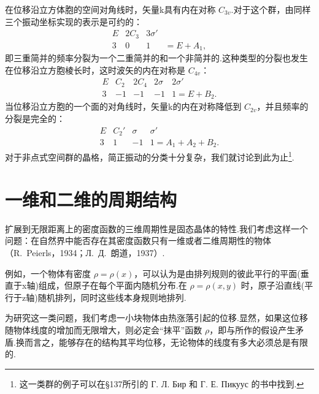 在位移沿立方体胞的空间对角线时，矢量k具有内在对称 $C_{3v}$.对于这个群，由同样三个振动坐标实现的表示是可约的：
\begin{equation*}
\begin{array}{cccc}
  E & 2C_3 & 3\sigma' & \\
  3 & 0 & 1 & =E+A_1,
\end{array}
\end{equation*}
即三重简并的频率分裂为一个二重简并的和一个非简并的.这种类型的分裂也发生在位移沿立方胞棱长时，这时波矢的内在对称是 $C_{4v}$：
\begin{equation*}
\begin{array}{ccccc}
  E & C_2 & 2C_4 & 2\sigma & 2\sigma' \\
  3 & -1 & -1 & -1 & 1=E+B_2.
\end{array}
\end{equation*}
当位移沿立方胞的一个面的对角线时，矢量k的内在对称降低到 $C_{2v}$，并且频率的分裂是完全的：
\begin{equation*}
\begin{array}{cccc}
  E & C_2' & \sigma & \sigma' \\
  3 & 1 & -1 & 1=A_1+A_2+B_2.
\end{array}
\end{equation*}
对于非点式空间群的晶格，简正振动的分类十分复杂，我们就讨论到此为止\footnote{这一类群的例子可以在§137所引的 Г. Л. Бир 和 Г. Е. Пикуус 的书中找到.}.

\section{一维和二维的周期结构}

扩展到无限距离上的密度函数的三维周期性是固态晶体的特性.我们考虑这样一个问题：在自然界中能否存在其密度函数只有一维或者二维周期性的物体（R.~Peierls，1934；Л.~Д.~朗道，1937）.

例如，一个物体有密度 $\rho=\rho(x)$，可以认为是由排列规则的彼此平行的平面(垂直于x轴)组成，但原子在每个平面内随机分布.在 $\rho=\rho(x,y)$ 时，原子沿直线(平行于z轴)随机排列，同时这些线本身规则地排列.

为研究这一类问题，我们考虑一小块物体由热涨落引起的位移.显然，如果这位移随物体线度的增加而无限增大，则必定会“抹平”函数 $\rho$，即与所作的假设产生矛盾.换而言之，能够存在的结构其平均位移，无论物体的线度有多大必须总是有限的.

